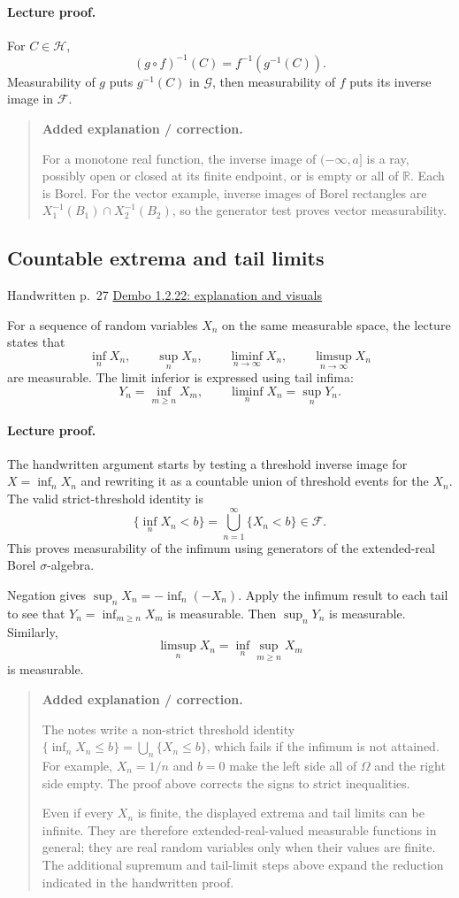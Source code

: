 \documentclass[11pt,letterpaper]{article}
\newcommand{\lecturesection}[1]{\subsection{#1}}
\begin{document}
\paragraph{Lecture proof.}
For $C\in\mathcal H$, \[ (g\circ f)^{-1}(C)=f^{-1}(g^{-1}(C)). \] Measurability of $g$ puts $g^{-1}(C)$ in $\mathcal G$, then measurability of $f$ puts its inverse image in $\mathcal F$.

\begin{quote}\small\textbf{Added explanation / correction.}

For a monotone real function, the inverse image of $(-\infty,a]$ is a ray, possibly open or closed at its finite endpoint, or is empty or all of $\mathbb R$. Each is Borel. For the vector example, inverse images of Borel rectangles are $X_1^{-1}(B_1)\cap X_2^{-1}(B_2)$, so the generator test proves vector measurability.
\end{quote}

\hypertarget{l3-s8}{}
\lecturesection{Countable extrema and tail limits}
{\small\textcolor{lectureink}{Handwritten p.\ 27} \quad \href{https://josephrbailey.com/probability/\#entry-1-2-22}{Dembo 1.2.22: explanation and visuals}}

For a sequence of random variables $X_n$ on the same measurable space, the lecture states that \[\inf_nX_n,\qquad\sup_nX_n,\qquad\liminf_{n\to\infty}X_n,\qquad\limsup_{n\to\infty}X_n\] are measurable. The limit inferior is expressed using tail infima: \[Y_n=\inf_{m\ge n}X_m,\qquad\liminf_nX_n=\sup_nY_n.\]

\paragraph{Lecture proof.}
The handwritten argument starts by testing a threshold inverse image for $X=\inf_nX_n$ and rewriting it as a countable union of threshold events for the $X_n$. The valid strict-threshold identity is \[\{\inf_nX_n<b\}=\bigcup_{n=1}^{\infty}\{X_n<b\}\in\mathcal F.\] This proves measurability of the infimum using generators of the extended-real Borel $\sigma$-algebra.

Negation gives $\sup_nX_n=-\inf_n(-X_n)$. Apply the infimum result to each tail to see that $Y_n=\inf_{m\ge n}X_m$ is measurable. Then $\sup_nY_n$ is measurable. Similarly, \[\limsup_nX_n=\inf_n\sup_{m\ge n}X_m\] is measurable.

\begin{quote}\small\textbf{Added explanation / correction.}

The notes write a non-strict threshold identity $\{\inf_nX_n\le b\}=\bigcup_n\{X_n\le b\}$, which fails if the infimum is not attained. For example, $X_n=1/n$ and $b=0$ make the left side all of $\Omega$ and the right side empty. The proof above corrects the signs to strict inequalities.

Even if every $X_n$ is finite, the displayed extrema and tail limits can be infinite. They are therefore extended-real-valued measurable functions in general; they are real random variables only when their values are finite. The additional supremum and tail-limit steps above expand the reduction indicated in the handwritten proof.
\end{quote}
\end{document}

